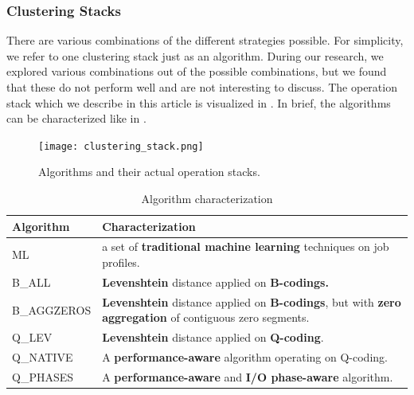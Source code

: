 \documentclass{jhps}
\begin{document}
\subsubsection{Clustering Stacks}
There are various combinations of the different strategies possible.
For simplicity, we refer to one clustering stack just as an algorithm.
During our research, we explored various combinations out of the possible combinations, but we found that these do not perform well and are not interesting to discuss.
The operation stack which we describe in this article is visualized in .
In brief, the algorithms can be characterized like in .

\begin{figure}[ht]
  \centering
  \texttt{[image: clustering\_stack.png]}
  \caption{Algorithms and their actual operation stacks.}
  \label{fig:clustering_stacks}
\end{figure}


\begin{table}[ht]
  \begin{tabularx}{\textwidth}{lX}
    Algorithm & Characterization \\
    \midrule
    ML            & a set of \textbf{traditional machine learning} techniques on job profiles.                                                        \\
    B\_ALL      & \textbf{Levenshtein} distance applied on \textbf{B-codings.}                                                                 \\
    B\_AGGZEROS & \textbf{Levenshtein} distance applied on \textbf{B-codings}, but with \textbf{zero aggregation} of contiguous zero segments. \\
    Q\_LEV      & \textbf{Levenshtein} distance applied on \textbf{Q-coding}.                                                             \\
    Q\_NATIVE   & A \textbf{performance-aware} algorithm operating on Q-coding.                                                                                           \\
    Q\_PHASES     & A \textbf{performance-aware} and \textbf{I/O phase-aware} algorithm.                                                              \\
  \end{tabularx}
  \caption{Algorithm characterization}
  \label{tab:alg_character}
\end{table}
\end{document}
